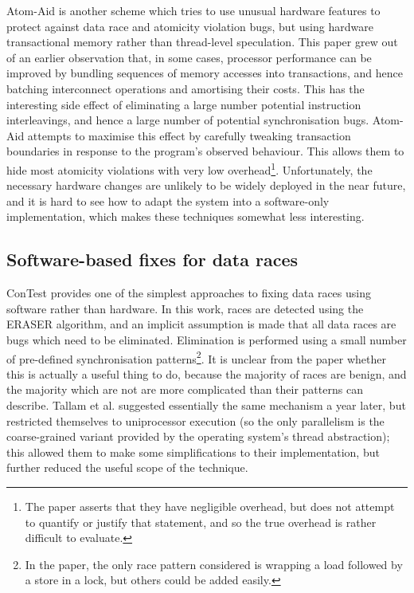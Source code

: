 Atom-Aid\cite{Lucia2009} is another scheme which tries to use unusual
hardware features to protect against data race and atomicity violation
bugs, but using hardware transactional memory\cite{Herlihy1993} rather
than thread-level speculation.  This paper grew out of an earlier
observation that, in some cases, processor performance can be improved
by bundling sequences of memory accesses into transactions, and hence
batching interconnect operations and amortising their
costs\cite{Ceze2007}.  This has the interesting side effect of
eliminating a large number potential instruction interleavings, and
hence a large number of potential synchronisation bugs.  Atom-Aid
attempts to maximise this effect by carefully tweaking transaction
boundaries in response to the program's observed behaviour.  This
allows them to hide most atomicity violations with very low
overhead\footnote{The paper asserts that they have negligible
  overhead, but does not attempt to quantify or justify that
  statement, and so the true overhead is rather difficult to
  evaluate.}.  Unfortunately, the necessary hardware changes are
unlikely to be widely deployed in the near future, and it is hard to
see how to adapt the system into a software-only implementation, which
makes these techniques somewhat less interesting.

\subsection{Software-based fixes for data races}
ConTest\cite{Krena2007} provides one of the simplest approaches to
fixing data races using software rather than hardware.  In this work,
races are detected using the ERASER\cite{Savage1997} algorithm, and an
implicit assumption is made that all data races are bugs which need to
be eliminated.  Elimination is performed using a small number of
pre-defined synchronisation patterns\footnote{In the paper, the only
  race pattern considered is wrapping a load followed by a store in a
  lock, but others could be added easily.}.  It is unclear from the
paper whether this is actually a useful thing to do, because the
majority of races are benign, and the majority which are not are more
complicated than their patterns can describe.  Tallam et
al.\cite{Tallam2008} suggested essentially the same mechanism a year
later, but restricted themselves to uniprocessor execution (so the
only parallelism is the coarse-grained variant provided by the
operating system's thread abstraction); this allowed them to make some
simplifications to their implementation, but further reduced the
useful scope of the technique.

